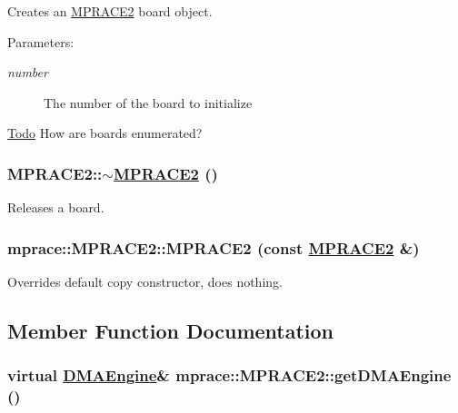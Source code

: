 Creates an \hyperlink{classmprace_1_1MPRACE2}{MPRACE2} board object. 

\begin{Desc}
\item[Parameters:]
\begin{description}
\item[{\em number}]The number of the board to initialize \end{description}
\end{Desc}
\begin{Desc}
\item[\hyperlink{todo__todo000003}{Todo}]How are boards enumerated? \end{Desc}
\hypertarget{classmprace_1_1MPRACE2_a1}{
\subsubsection[$\sim$MPRACE2]{\setlength{\rightskip}{0pt plus 5cm}MPRACE2::$\sim$\hyperlink{classmprace_1_1MPRACE2}{MPRACE2} ()}}
\label{classmprace_1_1MPRACE2_a1}


Releases a board. 

\hypertarget{classmprace_1_1MPRACE2_b0}{
\subsubsection[MPRACE2]{\setlength{\rightskip}{0pt plus 5cm}mprace::MPRACE2::MPRACE2 (const \hyperlink{classmprace_1_1MPRACE2}{MPRACE2} \&)}}
\label{classmprace_1_1MPRACE2_b0}


Overrides default copy constructor, does nothing. 



\subsection{Member Function Documentation}
\hypertarget{classmprace_1_1MPRACE2_a8}{
\subsubsection[getDMAEngine]{\setlength{\rightskip}{0pt plus 5cm}virtual \hyperlink{classmprace_1_1DMAEngine}{DMAEngine}\& mprace::MPRACE2::get\-DMAEngine ()}}
\label{classmprace_1_1MPRACE2_a8}


